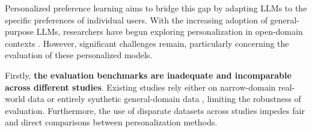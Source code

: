 \begin{table}[!h]
    \centering
    \small
    \caption{The comparison between different methods across four properties of personalization. Our framework evaluates personalization performance, adaptation capability to new users, fairness for minority users, and personalization tax on general-purpose preferences. For the performance, we use (\good, \medium, \bad) for good, medium, and low average scores. For the other properties, we report whether a method enables (\cmark) the corresponding property or not (\xmark).}
    \label{tab:benchmark_comparison}
    \vspace{-0.1cm}
\vspace{-0.5cm}
\end{table}


Personalized preference learning aims to bridge this gap by adapting LLMs to the specific preferences of individual users. With the increasing adoption of general-purpose LLMs, researchers have begun exploring personalization in open-domain contexts \citep{hwang_aligning_2023, jang_personalized_2023, li_personalized_2024}. However, significant challenges remain, particularly concerning the evaluation of these personalized models. %


Firstly, \textbf{the evaluation benchmarks are inadequate and incomparable across different studies}. Existing studies rely either on narrow-domain real-world data \citep{stiennon_learning_2022} or entirely synthetic general-domain data \citep{zollo_personalllm_2024,castricato_persona_2024}, limiting the robustness of evaluation. Furthermore, the use of disparate datasets across studies impedes fair and direct comparisons between personalization methods. 

